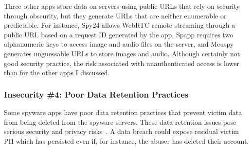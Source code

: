 
Three other apps store data on servers using public URLs that rely on
security through obscurity, but they generate URLs that are neither
enumerable or predictable.  For instance, Spy24 allows WebRTC remote
streaming through a public URL based on a request ID generated by the
app, Spapp requires two alphanumeric keys to access image and audio
files on the server, and Meuspy generates unguessable URLs to
store images and audio.  Although certainly not good security
practice, the risk associated with unauthenticated access is lower
than for the other apps I discussed.





\subsubsection*{Insecurity \#4: Poor Data Retention Practices}


Some spyware apps have poor data retention practices that prevent
victim data from being deleted from the spyware servers. These data retention issues pose serious security and privacy risks~\cite{santhanam2022scraping}. A data breach could expose residual victim PII which has persisted even if, for instance, the abuser has deleted their account.

